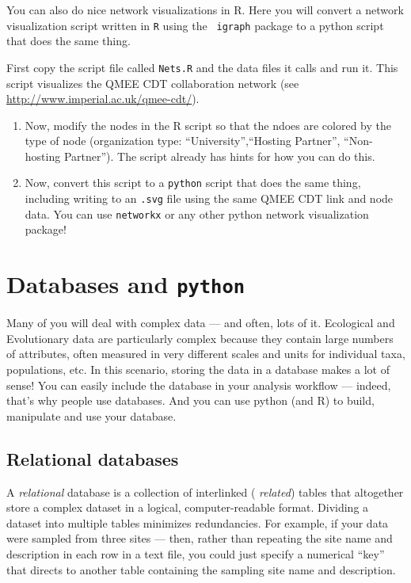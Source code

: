 You can also do nice network visualizations in R. Here you will convert 
a network visualization script written in {\tt R} using the {\tt 
igraph} package to a python script that does the same thing.  

First copy the script file called {\tt Nets.R} and the data files it 
calls and run it. This script visualizes the QMEE CDT collaboration 
network (see \url{http://www.imperial.ac.uk/qmee-cdt/}). 

\begin{enumerate}
	
\item Now, modify the nodes in the R script so that the ndoes are 
colored by the type of node (organization type: 
``University'',``Hosting Partner'', ``Non-hosting Partner''). The 
script already has hints for how you can do this. 

\item Now, convert this script to a {\tt python} script that does the same 
thing, including writing to an {\tt *.svg} file using the same QMEE CDT 
link and node data. You can use {\tt networkx} or any other python 
network visualization package!

\end{enumerate}


\section{Databases and {\tt python}}

Many of you will deal with complex data --- and often, lots of it. 
Ecological and Evolutionary data are particularly complex because they 
contain large numbers of attributes, often measured in very different 
scales and units for individual taxa, populations, etc. In this 
scenario, storing the data in a database makes a lot of sense! You can 
easily include the database in your analysis workflow --- indeed, 
that's why people use databases. And you can use python (and R) to 
build, manipulate and use your database.   

\subsection{Relational databases}

A {\it relational} database is a collection of interlinked ({\it 
related}) tables that altogether store a complex dataset in a logical, 
computer-readable format. Dividing a dataset into multiple tables 
minimizes redundancies. For example, if your data were sampled from 
three sites --- then, rather than repeating the site name and 
description in each row in a text file, you could just specify a 
numerical ``key'' that directs to another table containing the sampling 
site name and description.

